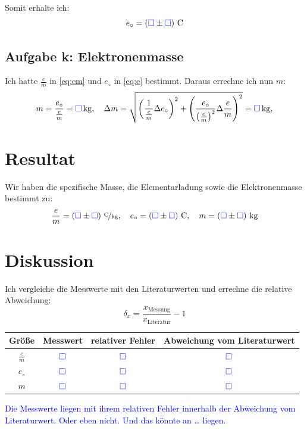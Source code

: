 \documentclass[11pt]{article}
\newcommand{\emesswert}{\left(\messwert \pm \messwert \right)}
\newcommand{\messwert}{\textcolor{blue}{\square}}
\begin{document}
Somit erhalte ich:
\begin{equation}
	\label{eq:e}
	e_\circ = \unit[\emesswert] C
\end{equation}

\subsection{Aufgabe k: Elektronenmasse}

Ich hatte $\frac em$ in \eqref{eq:em} und $e_\circ$ in \eqref{eq:e} bestimmt.
Daraus errechne ich nun $m$:
\[
	m = \frac{e_\circ}{\frac em} = \unit[\messwert]{kg},
	\quad
	\Delta m = \sqrt{
		\left(\frac{1}{\frac em} \Delta e_\circ \right)^2
		+ \left( \frac{e_\circ}{\left( \frac em \right)^2} \Delta \frac em \right)^2
	}
	= \unit[\messwert]{kg},
\]


\section{Resultat}

Wir haben die spezifische Masse, die Elementarladung sowie die Elektronenmasse
bestimmt zu:
\[
	\frac em = \unitfrac[\emesswert]C{kg}
	, \quad
	e_\circ = \unit[\emesswert]C
	, \quad
	m = \unit[\emesswert]{kg}
\]



\section{Diskussion}

Ich vergleiche die Messwerte mit den Literaturwerten und errechne die relative
Abweichung:
\[ \delta_x = \frac{x_\text{Messung}}{x_\text{Literatur}} -1 \]

\begin{table}[h!]
	\centering

	\begin{tabular}{cccc}
		Größe & Messwert & relativer Fehler & Abweichung vom Literaturwert \\
		\hline
		$\frac em$ & $\messwert$ & $\messwert$ & $\messwert$ \\
		$e_\circ$ & $\messwert$ & $\messwert$ & $\messwert$ \\
		$m$ & $\messwert$ & $\messwert$ & $\messwert$
	\end{tabular}
\end{table}

\textcolor{blue}{Die Messwerte liegen mit ihrem relativen Fehler innerhalb der
Abweichung vom Literaturwert. Oder eben nicht. Und das könnte an … liegen.}
\end{document}
